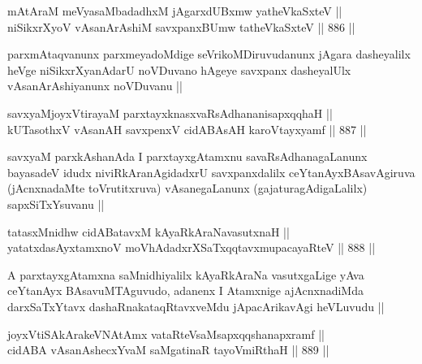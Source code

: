 
\begin{shl}
mAtAraM meVyasaMbadadhxM jAgarxdUBxmw yatheVkaSxteV || \\
niSikxrXyoV vAsanArAshiM savxpanxBUmw tatheVkaSxteV ||  886 ||  
\end{shl}

\begin{artha}
parxmAtaqvanunx parxmeyadoMdige seVrikoMDiruvudanunx jAgara dasheyalilx heVge niSikxrXyanAdarU noVDuvano hAgeye savxpanx dasheyalUlx vAsanArAshiyanunx noVDuvanu ||
\end{artha}


\begin{shl}
savxyaMjoyxVtirayaM parxtayxknasxvaRsAdhananisapxqqhaH || \\
kUTasothxV vAsanAH savxpenxV cidABAsAH karoVtayxyamf ||  887 ||  
\end{shl}

\begin{artha}
savxyaM parxkAshanAda I parxtayxgAtamxnu savaRsAdhanagaLanunx bayasadeV idudx niviRkAranAgidadxrU savxpanxdalilx ceYtanAyxBAsavAgiruva (jAcnxnadaMte toVrutitxruva) vAsanegaLanunx (gajaturagAdigaLalilx) sapxSiTxYsuvanu ||
\end{artha}


\begin{shl}
tatasxMnidhw cidABatavxM kAyaRkAraNavasutxnaH ||  \\
yatatxdasAyx\s \s tamxnoV moVhAdadxrXSaTxqqtavxmupacayaRteV ||  888 ||  
\end{shl}

\begin{artha}
A parxtayxgAtamxna saMnidhiyalilx kAyaRkAraNa vasutxgaLige yAva ceYtanAyx BAsavuMTAguvudo, adanenx I Atamxnige ajAcnxnadiMda darxSaTxYtavx dashaRnakataqRtavxveMdu jApacArikavAgi heVLuvudu ||
\end{artha}


\begin{shl}
joyxVtiSA\s kArakeVNA\s \s tAmx vataRteV\s saMsapxqqshanapxramf ||  \\
cidABA vAsanAshecxYvaM saMgatinaR tayoVmiRthaH ||  889 ||  
\end{shl}


